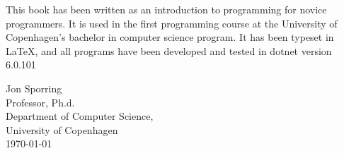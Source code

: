 %
%

\preface

This book has been written as an introduction to programming for novice programmers. It is used in the first programming course at the University of Copenhagen's bachelor in computer science program. It has been typeset in \LaTeX, and all programs have been developed and tested in dotnet version 6.0.101


\vspace*{1cm}
Jon Sporring\\
Professor, Ph.d.\\
Department of Computer Science,\\
University of Copenhagen\\
\today\\
